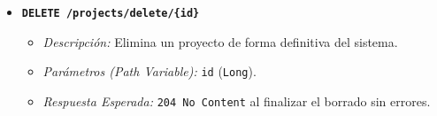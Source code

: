 \documentclass[12pt,a4paper]{article}
\begin{document}
\begin{itemize}
\begin{itemize}
        \item \textit{Parámetros:} Path Variable \texttt{id} (\texttt{Long}) y Body JSON con los nuevos atributos.
        \item \textit{Respuesta Esperada:} \texttt{200 OK} con la información actualizada.
    \end{itemize}
    \item \textbf{\texttt{DELETE /projects/delete/\{id\}}}
    \begin{itemize}
        \item \textit{Descripción:} Elimina un proyecto de forma definitiva del sistema.
        \item \textit{Parámetros (Path Variable):} \texttt{id} (\texttt{Long}).
        \item \textit{Respuesta Esperada:} \texttt{204 No Content} al finalizar el borrado sin errores.
    \end{itemize}
\end{itemize}
\end{document}
